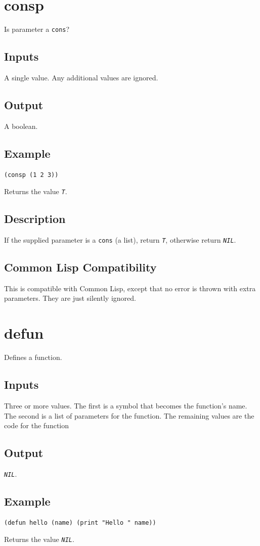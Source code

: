 \documentclass[10pt, openany]{book}
\newcommand{\constant}[1]{\emph{\texttt{#1}}}
\newcommand{\datatype}[1]{\texttt{#1}}
\newcommand{\cl}{Common Lisp}
\begin{document}
\section{consp}
Is parameter a \datatype{cons}?
\subsection{Inputs}
A single value.  Any additional values are ignored.
\subsection{Output}
A boolean.
\subsection{Example}
\begin{lstlisting}
(consp (1 2 3))
\end{lstlisting}
Returns the value \constant{T}.
\subsection{Description}
If the supplied parameter is a \datatype{cons} (a list), return \constant{T}, otherwise return \constant{NIL}.
\subsection{Common Lisp Compatibility}
This is compatible with \cl, except that no error is thrown with extra parameters.  They are just silently ignored.

\section{defun}
Defines a function.
\subsection{Inputs}
Three or more values.  The first is a symbol that becomes the function's name.  The second is a list of parameters for the function.  The remaining values are the code for the function
\subsection{Output}
\constant{NIL}.
\subsection{Example}
\begin{lstlisting}
(defun hello (name) (print "Hello " name))
\end{lstlisting}
Returns the value \constant{NIL}.
\end{document}

